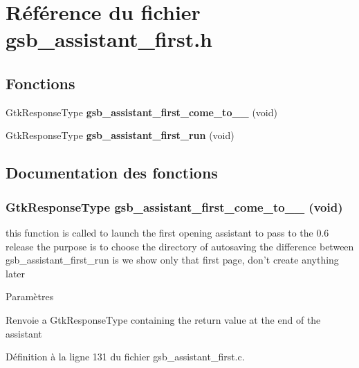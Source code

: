\section{Référence du fichier gsb\_\-assistant\_\-first.h}
\label{gsb__assistant__first_8h}
\subsection*{Fonctions}
\begin{DoxyCompactItemize}
\item 
GtkResponseType {\bf gsb\_\-assistant\_\-first\_\-come\_\-to\_\_} (void)
\item 
GtkResponseType {\bf gsb\_\-assistant\_\-first\_\-run} (void)
\end{DoxyCompactItemize}


\subsection{Documentation des fonctions}
\subsubsection[{gsb\_\-assistant\_\-first\_\-come\_\-to\_\-0\_\-6}]{\setlength{\rightskip}{0pt plus 5cm}GtkResponseType gsb\_\-assistant\_\-first\_\-come\_\-to\_\_ (void)}\label{gsb__assistant__first_8h_a8b17583fe61c7e9a9eb87a9d02857dce}
this function is called to launch the first opening assistant to pass to the 0.6 release the purpose is to choose the directory of autosaving the difference between gsb\_\-assistant\_\-first\_\-run is we show only that first page, don't create anything later


\begin{DoxyParams}{Paramètres}
\item[{\em }]\end{DoxyParams}
\begin{DoxyReturn}{Renvoie}
a GtkResponseType containing the return value at the end of the assistant 
\end{DoxyReturn}


Définition à la ligne 131 du fichier gsb\_\-assistant\_\-first.c.

